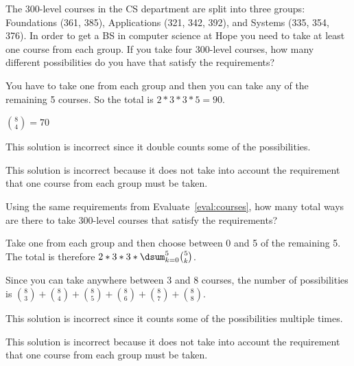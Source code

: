 \begin{eval}\label{eval:courses}
The 300-level courses in the CS department are split into three groups: Foundations (361, 385), 
Applications (321, 342, 392), and Systems (335, 354, 376).  
In order to get a BS in computer science at Hope you need to take at least one course from
each group.
If you take four 300-level courses, 
how many different possibilities do you have that satisfy the requirements?
\begin{ssolenum}
\item
You have to take one from each group and then you can take any of the remaining 5 courses.
So the total is $2*3*3*5=90$.

\noindent
\evallinetwo
\item
$\binom{8}{4}=70$

\noindent
\evallinetwo
\end{ssolenum}
\begin{answer}
\begin{solevalenum}
\item
This solution is incorrect since it double counts some of the possibilities.
\item
This solution is incorrect because it does not take into account the requirement
that one course from each group must be taken.
\end{solevalenum}
\end{answer}
\end{eval}


\begin{eval}
Using the same requirements from Evaluate~\ref{eval:courses}, 
how many total ways are there to take 300-level courses that satisfy the requirements?
\begin{ssolenum}
\item
Take one from each group and then choose between 0 and 5 of the remaining 5.  The total is
therefore $2*3*3*\dsum_{k=0}^5 \binom{5}{k}$.

\noindent
\evallinetwo
\item
Since you can take anywhere between $3$ and $8$ courses, the number of possibilities is
$\binom{8}{3}+\binom{8}{4}+\binom{8}{5}+\binom{8}{6}+\binom{8}{7}+\binom{8}{8}$.

\noindent
\evallinetwo
\end{ssolenum}
\begin{answer}
\begin{solevalenum}
\item
This solution is incorrect since it counts some of the possibilities multiple times.
\item
This solution is incorrect because it does not take into account the requirement
that one course from each group must be taken.
\end{solevalenum}
\end{answer}
\end{eval}

